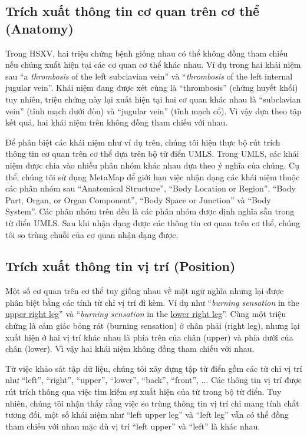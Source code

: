 \subsection*{Trích xuất thông tin cơ quan trên cơ thể (Anatomy)}
Trong HSXV, hai triệu chứng bệnh giống nhau có thể không đồng tham chiếu nếu chúng xuất hiện tại các cơ quan cơ thể khác nhau. Ví dụ trong hai khái niệm sau ``a \textit{thrombosis} of the left subclavian vein'' và ``\textit{thrombosis} of the left internal jugular vein''. Khái niệm đang được xét cùng là ``thrombosis'' (chứng huyết khối) tuy nhiên, triệu chứng này lại xuất hiện tại hai cơ quan khác nhau là ``subclavian vein'' (tĩnh mạch dưới đòn) và ``jugular vein'' (tĩnh mạch cổ). Vì vậy dựa theo tập kết quả, hai khái niệm trên không đồng tham chiếu với nhau.

Để phân biệt các khái niệm như ví dụ trên, chúng tôi hiện thực bộ rút trích thông tin cơ quan trên cơ thể dựa trên bộ từ điển UMLS. Trong UMLS, các khái niệm được chia vào nhiều phân nhóm khác nhau dựa theo ý nghĩa của chúng. Cụ thể, chúng tôi sử dụng MetaMap để giới hạn việc nhận dạng các khái niệm thuộc các phân nhóm sau ``Anatomical Structure'', ``Body Location or Region'', ``Body Part, Organ, or Organ Component'', ``Body Space or Junction'' và ``Body System''. Các phân nhóm trên đều là các phân nhóm được định nghĩa sẵn trong từ điển UMLS. Sau khi nhận dạng được các thông tin cơ quan trên cơ thể, chúng tôi so trùng chuỗi của cơ quan nhận dạng được.

\subsection*{Trích xuất thông tin vị trí (Position)}
Một số cơ quan trên cơ thể tuy giống nhau về mặt ngữ nghĩa nhưng lại được phân biệt bằng các tính từ chỉ vị trí đi kèm. Ví dụ như ``\textit{burning sensation} in the \underline{upper right leg}'' và ``\textit{burning sensation} in the \underline{lower right leg}''. Cùng một triệu chứng là cảm giác bỏng rát (burning sensation) ở chân phải (right leg), nhưng lại xuất hiện ở hai vị trí khác nhau là phía trên của chân (upper) và phía dưới của chân (lower). Vì vậy hai khái niệm không đồng tham chiếu với nhau.

Từ việc khảo sát tập dữ liệu, chúng tôi xây dựng tập từ điển gồm các từ chỉ vị trí như ``left'', ``right'', ``upper'', ``lower'', ``back'', ``front'', ... Các thông tin vị trí được rút trích thông qua việc tìm kiếm sự xuất hiện của từ trong bộ từ điển. Tuy nhiên, chúng tôi nhận thấy rằng việc so trùng thông tin vị trí chỉ mang tính chất tương đối, một số khái niệm như ``left upper leg'' và ``left leg'' vẫn có thể đồng tham chiếu với nhau mặc dù vị trí ``left upper'' và ``left'' là khác nhau.

